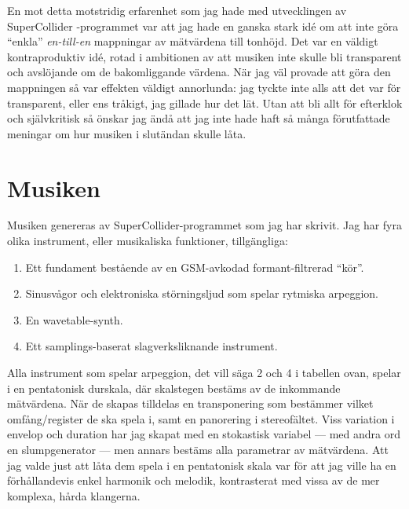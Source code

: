 \documentclass[11pt, a4paper]{article} %
\begin{document}
En mot detta motstridig erfarenhet som jag hade med utvecklingen av SuperCollider -programmet var att jag hade en ganska stark idé om att inte göra ``enkla'' \emph{en-till-en} mappningar av mätvärdena till tonhöjd. Det var en väldigt kontraproduktiv idé, rotad i ambitionen av att musiken inte skulle bli transparent och avslöjande om de bakomliggande värdena. När jag väl provade att göra den mappningen så var effekten väldigt annorlunda: jag tyckte inte alls att det var för transparent, eller ens tråkigt, jag gillade hur det lät. Utan att bli allt för efterklok och självkritisk så önskar jag ändå att jag inte hade haft så många förutfattade meningar om hur musiken i slutändan skulle låta.

\section*{Musiken}

Musiken genereras av SuperCollider-programmet som jag har skrivit. Jag har fyra olika instrument, eller musikaliska funktioner, tillgängliga:

  \begin{enumerate}[noitemsep]
	\item Ett fundament bestående av en GSM-avkodad formant-filtrerad ``kör''.
	\item Sinusvågor och elektroniska störningsljud som spelar rytmiska arpeggion.
	\item En wavetable-synth.
	\item Ett samplings-baserat slagverksliknande instrument.
  \end{enumerate}

Alla instrument som spelar arpeggion, det vill säga 2 och 4 i tabellen ovan, spelar i en pentatonisk durskala, där skalstegen bestäms av de inkommande mätvärdena. När de skapas tilldelas en transponering som bestämmer vilket omfång/register de ska spela i, samt en panorering i stereofältet. Viss variation i envelop och duration har jag skapat med en stokastisk variabel --- med andra ord en slumpgenerator --- men annars bestäms alla parametrar av mätvärdena. Att jag valde just att låta dem spela i en pentatonisk skala var för att jag ville ha en förhållandevis enkel harmonik och melodik, kontrasterat med vissa av de mer komplexa, hårda klangerna. 
\end{document}
